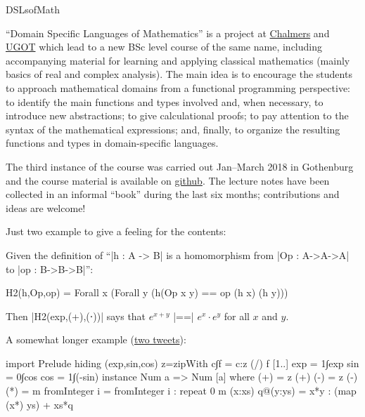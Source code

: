 \begin{hcarentry}[updated]{DSLsofMath}
\label{dslsofmath}
\makeheader

{
\def\doubleequalsdslm{\mathrel{\unitlength 0.01em
  \begin{picture}(78,40)
    \put(7,34){\line(1,0){25}} \put(45,34){\line(1,0){25}}
    \put(7,14){\line(1,0){25}} \put(45,14){\line(1,0){25}}
  \end{picture}}}

``Domain Specific Languages of Mathematics'' is a project at
\href{http://www.chalmers.se/en/Pages/default.aspx}{Chalmers} and
\href{http://www.gu.se/english}{UGOT} which lead to a new BSc level course of
the same name, including accompanying material for learning and applying
classical mathematics (mainly basics of real and complex analysis).
%
The main idea is to encourage the students to approach mathematical domains
from a functional programming perspective:
%
to identify the main functions and types involved and, when necessary, to
introduce new abstractions;
%
to give calculational proofs;
%
to pay attention to the syntax of the mathematical expressions;
%
and, finally, to organize the resulting functions and types in domain-specific
languages.

The third instance of the course was carried out Jan--March 2018 in Gothenburg
and the course material is available on
\href{https://github.com/DSLsofMath/DSLsofMath}{github}.
%
The lecture notes have been collected in an informal ``book'' during
the last six months; contributions and ideas are welcome!

Just two example to give a feeling for the contents:

Given the definition of ``|h : A -> B| is a homomorphism from
|Op : A->A->A| to |op : B->B->B|'':
\begin{spec}
H2(h,Op,op) = Forall x (Forall y (h(Op x y) == op (h x) (h y)))
\end{spec}
Then |H2(exp,(+),(⋅))| says that $e^{x+y}$ |==| $e^x \cdot e^y$
for all $x$ and $y$.

A somewhat longer example (\href{https://twitter.com/patrikja/status/966074410611413000}{two tweets}):
\begin{code}
import Prelude hiding (exp,sin,cos)
z=zipWith
c∫f  = c:z (/) f [1..]
exp  = 1∫exp
sin  = 0∫cos
cos  = 1∫(-sin)
instance Num a => Num [a] where
  (+)  = z (+)
  (-)  = z (-)
  (*)  = m
  fromInteger i = fromInteger i : repeat 0
m (x:xs) q@(y:ys) = x*y : (map (x*) ys) + xs*q


\end{code}}
\end{hcarentry}
